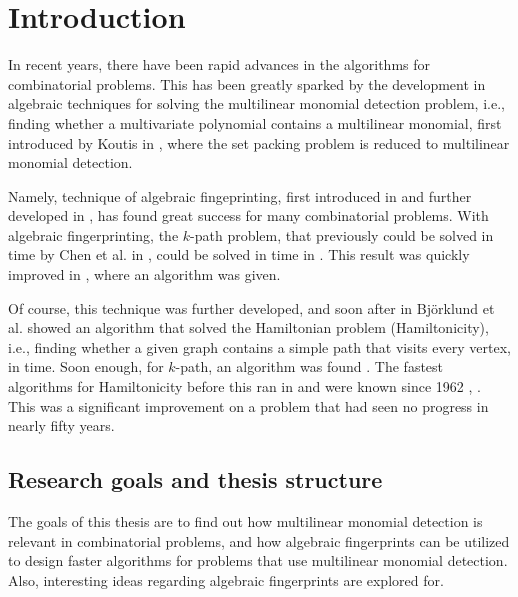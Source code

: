 
\section{Introduction}

In recent years, there have been rapid advances in the algorithms for combinatorial problems. 
This has been greatly sparked by the development in algebraic techniques for solving the 
multilinear monomial detection problem, i.e., finding whether a multivariate polynomial contains a multilinear monomial, 
first introduced by Koutis in \cite{Koutis05}, where the set packing problem is reduced to multilinear monomial detection.\nl

Namely, technique of algebraic fingeprinting, first introduced in \cite{Koutis08} and further developed in \cite{Williams09}, 
has found great success for many combinatorial problems. 
With algebraic fingerprinting, the $k$-path problem, 
that previously could be solved in  time by Chen et al. in \cite{Chen07}, 
could be solved in  time in \cite{Koutis08}. 
This result was quickly improved in \cite{Williams09}, where an  algorithm was given.\nl

Of course, this technique was further developed, and soon after in \cite{Björklund14} Björklund et al. showed an algorithm 
that solved the Hamiltonian problem (Hamiltonicity), i.e., finding whether a given graph contains a simple path that visits 
every vertex, in  time. Soon enough, for $k$-path, an  algorithm was found \cite{Björklund17}. 
The fastest algorithms for Hamiltonicity before this ran in  
and were known since 1962 \cite{HelKar62}, \cite{Bellman62}.
This was a significant improvement on a problem that had seen no progress in nearly fifty years.

\subsection{Research goals and thesis structure}

The goals of this thesis are to find out how multilinear monomial detection is relevant in 
combinatorial problems, and how algebraic fingerprints can be utilized to design faster 
algorithms for problems that use multilinear monomial detection. Also, interesting ideas 
regarding algebraic fingerprints are explored for.\nl

